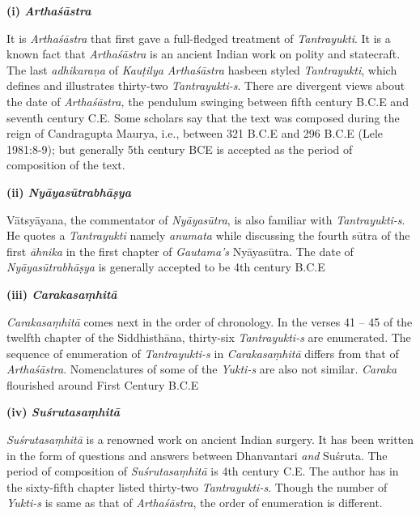 \newpage

\textbf{(i) \textit{Arthaśāstra}}

It is \textit{Arthaśāstra} that first gave a full-fledged treatment of \textit{Tantrayukti}. It is a known fact that \textit{Arthaśāstra} is an ancient Indian work on polity and statecraft. The last \textit{adhikaraṇa} of \textit{Kauṭilya Arthaśāstra} has\break been styled \textit{Tantrayukti}, which defines and illustrates thirty-two \textit{Tantrayukti-s}. There are divergent views about the date of \textit{Arthaśāstra,} the pendulum swinging between fifth century B.C.E and seventh century C.E. Some scholars say that the text was composed during the reign of Candragupta Maurya, i.e., between 321 B.C.E and 296 B.C.E (Lele 1981:8-9); but generally 5th century BCE is accepted as the period of composition of the text.

\vskip 2pt

\textbf{(ii) \textit{Nyāyasūtrabhāṣya}}

Vātsyāyana, the commentator of \textit{Nyāyasūtra}, is also familiar with \textit{Tantrayukti-s}. He quotes a \textit{Tantrayukti} namely \textit{anumata} while discussing the fourth sūtra of the first \textit{āhnika} in the first chapter of \textit{Gautama’s} Nyāyasūtra. The date of \textit{Nyāyasūtrabhāṣya} is generally accepted to be 4th century B.C.E

\vskip 2pt

\textbf{(iii) \textit{Carakasaṃhitā}}

\textit{Carakasaṃhitā} comes next in the order of chronology. In the verses 41 – 45 of the twelfth chapter of the Siddhisthāna, thirty-six \textit{Tantrayukti-s} are enumerated. The sequence of enumeration of \textit{Tantrayukti-s} in \textit{Carakasaṃhitā} differs from that of \textit{Arthaśāstra}. Nomenclatures of some of the \textit{Yukti-s} are also not similar. \textit{Caraka} flourished around First Century B.C.E

\vskip 2pt

\textbf{(iv) \textit{Suśrutasaṃhitā}}

\textit{Suśrutasaṃhitā} is a renowned work on ancient Indian surgery. It has been written in the form of questions and answers between Dhanvantari \textit{and} Suśruta. The period of composition of \textit{Suśrutasaṃhitā} is 4th century C.E. The author has in the sixty-fifth chapter listed thirty-two \textit{Tantrayukti-s}. Though the number of \textit{Yukti-s} is same as that of \textit{Arthaśāstra}, the order of enumeration is different.

